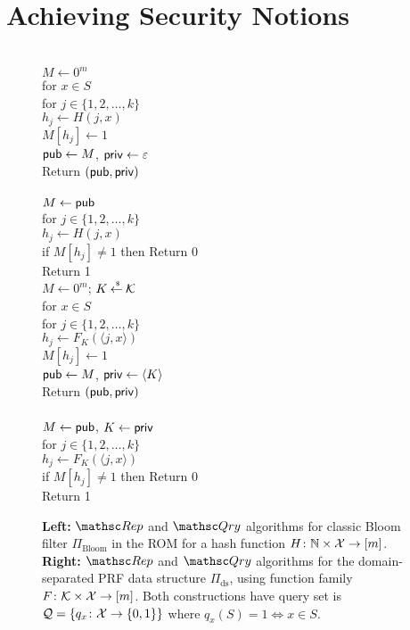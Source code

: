 \section{Achieving Security Notions}



\begin{figure}[tp]
\centering
{}
{
\\
$M \gets 0^m$\\
for $x \in S$\\
\nudge for $j \in \{1,2,\ldots,k\}$\\
\nudge\nudge $h_j \gets H(j,x)$\\
\nudge\nudge $M[h_j] \gets 1$\\
${\sf pub} \gets M$, ${\sf priv} \gets \varepsilon$\\
Return $({\sf pub},{\sf priv})$\\

\medskip
{}\\
$M\gets{\sf pub}$\\
for $j \in \{1,2,\ldots,k\}$\\
\nudge $h_j \gets H(j,x)$\\
\nudge if $M[h_j] \neq 1$ then Return 0\\
Return 1
}
{
\\
$M \gets 0^m$; $K {\:\stackrel{{\scriptscriptstyle \hspace{0.2em}\$}} {\leftarrow}\:} {\cal K}$\\
for $x \in S$\\
\nudge for $j \in \{1,2,\ldots,k\}$\\
\nudge\nudge $h_j \gets F_{K}(\langle j,x \rangle) $\\
\nudge\nudge $M[h_j] \gets 1$\\
${\sf pub} \gets M$, ${\sf priv} \gets \langle K \rangle$\\
Return $({\sf pub},{\sf priv})$\\

\medskip
{}\\
$M\gets{\sf pub}$, $K \gets {\sf priv}$\\
for $j \in \{1,2,\ldots,k\}$\\
\nudge $h_j \gets F_{K}(\langle j,x \rangle) $\\
\nudge if $M[h_j] \neq 1$ then Return 0\\
Return 1
}
\caption{{\bf Left:} $\Rep$ and $\Qry$ algorithms for classic Bloom
  filter $\Pi_{\mathrm{Bloom}}$ in the ROM for a hash function $H\colon \mathbb{N} \times
  {\cal X} \to [m]$. {\bf Right:} $\Rep$ and $\Qry$
  algorithms for the domain-separated PRF data structure
  $\Pi_{\mathrm{ds}}$, using function family $F \colon
  {\cal K} \times {\cal X} \to [m]$.  Both constructions have query set is ${\cal Q}=\{q_x\colon
  {\cal X} \to \{0,1\}\}$ where $q_x(S)=1 \Leftrightarrow x \in S$.  }
\label{fig:bf-and-lin}
\end{figure}

